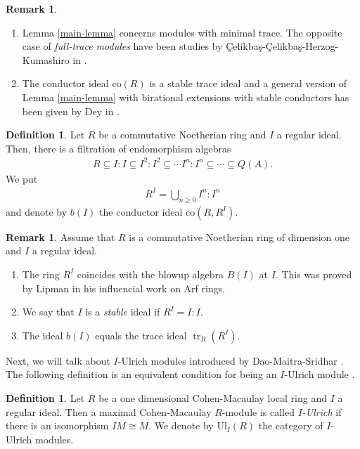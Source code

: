 \documentclass[12pt]{amsart}
\newcommand\co{\mathrm{co}}
\theoremstyle{definition}
\newtheorem{definition}[theorem]{Definition}
\newtheorem{remark}[theorem]{Remark}
\DeclareMathOperator{\tr}{\mathrm{tr}}
\newcommand\oznewtext[1]{{\color{olive} #1}} %
\begin{document}
\oznewtext{
\begin{remark}
    \begin{enumerate}
        \item Lemma \ref{main-lemma} concerns modules with minimal trace. The opposite case of \textit{full-trace modules} have been studies by {\c C}elikba{\c s}-{\c C}elikba{\c s}-Herzog-Kumashiro in \cite{Celikbas-Celikbas-Herzog-Kumashiro}.
        \item The conductor ideal $\co(R)$ is a stable trace ideal and a general version of Lemma \ref{main-lemma} with birational extensions with stable conductors has been given by Dey in \cite[Corollary 4.5]{Dey}.
    \end{enumerate}
\end{remark}
}
\fi
\begin{definition}
    Let $R$ be a commutative Noetherian ring and $I$ a regular ideal. Then, there is a filtration of endomorphism algebras 
    \begin{align*}
    R \subseteq I \colon I \subseteq I^2 \colon I^2 \subseteq \cdots I^n \colon I^n \subseteq \cdots \subseteq Q(A).
    \end{align*}
    We put 
    \begin{align*}
    R^I = \bigcup_{n \geq 0} I^n \colon I^n
    \end{align*}        
    and denote by $b(I)$ the conductor ideal $\co(R,R^I)$.
\end{definition}
\begin{remark}\label{blow-up-remarks}
    Assume that $R$ is a commutative Noetherian ring of dimension one and $I$ a regular ideal.
    \begin{enumerate}
        \item The ring $R^I$ coincides with the blowup algebra $B(I)$ at $I$. This was proved by Lipman in his influencial work \cite{Lipman} on Arf rings.
        \item We say that $I$ is a \textit{stable} ideal if $R^I = I \colon I$.
        \item The ideal $b(I)$ equals the trace ideal $\tr_R(R^I)$.
    \end{enumerate}
\end{remark}
Next, we will talk about $I$-Ulrich modules introduced by Dao-Maitra-Sridhar \cite{Dao-Maitra-Sridhar}. The following definition is an equivalent condition for being an $I$-Ulrich module \cite[Theorem 4.6]{Dao-Maitra-Sridhar}. 
\begin{definition}
    Let $R$ be a one dimensional Cohen-Macaulay local ring and $I$ a regular ideal. Then a maximal Cohen-Macaulay $R$-module is called \textit{$I$-Ulrich} if there is an isomorphism $IM \cong M$. We denote by $\mathrm{Ul}_I(R)$ the category of $I$-Ulrich modules.
\end{definition}
\end{document}
